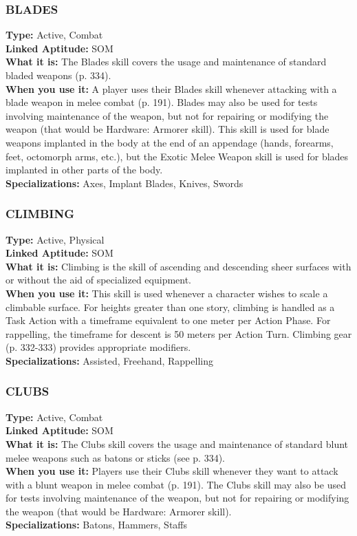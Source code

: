 \subsubsection{BLADES}
\textbf{Type:} Active, Combat
\\ \textbf{Linked Aptitude:} SOM
\\ \textbf{What it is:} The Blades skill covers the usage and
maintenance of standard bladed weapons (p. 334).
\\ \textbf{When you use it:} A player uses their Blades skill
whenever attacking with a blade weapon in melee
combat (p. 191). Blades may also be used for tests
involving maintenance of the weapon, but not for
repairing or modifying the weapon (that would be
Hardware: Armorer skill). This skill is used for blade
weapons implanted in the body at the end of an appendage (hands, forearms, feet, octomorph arms, etc.),
but the Exotic Melee Weapon skill is used for blades
implanted in other parts of the body.
\\ \textbf{Specializations:} Axes, Implant Blades, Knives, Swords

\subsubsection{CLIMBING}
\textbf{Type:} Active, Physical
\\ \textbf{Linked Aptitude:} SOM
\\ \textbf{What it is:} Climbing is the skill of ascending and
descending sheer surfaces with or without the aid of
specialized equipment.
\\ \textbf{When you use it:} This skill is used whenever a character wishes to scale a climbable surface. For heights
greater than one story, climbing is handled as a Task
Action with a timeframe equivalent to one meter per
Action Phase. For rappelling, the timeframe for descent is 50 meters per Action Turn. Climbing gear (p.
332-333) provides appropriate modifiers.
\\ \textbf{Specializations:} Assisted, Freehand, Rappelling

\subsubsection{CLUBS}
\textbf{Type:} Active, Combat
\\ \textbf{Linked Aptitude:} SOM
\\ \textbf{What it is:} The Clubs skill covers the usage and
maintenance of standard blunt melee weapons such
as batons or sticks (see p. 334).
\\ \textbf{When you use it:} Players use their Clubs skill whenever they want to attack with a blunt weapon in melee
combat (p. 191). The Clubs skill may also be used for
tests involving maintenance of the weapon, but not
for repairing or modifying the weapon (that would be
Hardware: Armorer skill).
\\ \textbf{Specializations:} Batons, Hammers, Staffs

